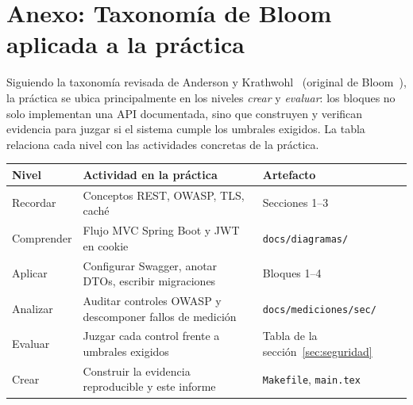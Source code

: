 \documentclass[11pt,a4paper]{article}
\newcommand{\ruta}[1]{\texttt{\footnotesize #1}}
\begin{document}
\appendix
\section{Anexo: Taxonomía de Bloom aplicada a la práctica}

Siguiendo la taxonomía revisada de Anderson y Krathwohl~\cite{anderson2001}
(original de Bloom~\cite{bloom1956}), la práctica se ubica principalmente en
los niveles \emph{crear} y \emph{evaluar}: los bloques no solo implementan
una API documentada, sino que construyen y verifican evidencia para juzgar si
el sistema cumple los umbrales exigidos. La tabla relaciona cada nivel con
las actividades concretas de la práctica.

\begin{center}
\begin{tabular}{@{}p{2.6cm}p{6.4cm}p{6.4cm}@{}}
\toprule
\textbf{Nivel} & \textbf{Actividad en la práctica} & \textbf{Artefacto} \\
\midrule
Recordar & Conceptos REST, OWASP, TLS, caché & Secciones 1--3 \\
Comprender & Flujo MVC Spring Boot y JWT en cookie & \ruta{docs/diagramas/} \\
Aplicar & Configurar Swagger, anotar DTOs, escribir migraciones & Bloques 1--4 \\
Analizar & Auditar controles OWASP y descomponer fallos de medición & \ruta{docs/mediciones/sec/} \\
Evaluar & Juzgar cada control frente a umbrales exigidos & Tabla de la sección~\ref{sec:seguridad} \\
Crear & Construir la evidencia reproducible y este informe & \ruta{Makefile}, \ruta{main.tex} \\
\bottomrule
\end{tabular}
\end{center}

\newpage


\end{document}
